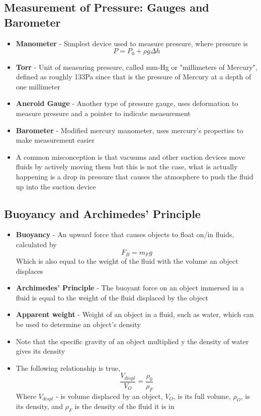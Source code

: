 \subsection{Measurement of Pressure: Gauges and Barometer}
\begin{itemize}
    \item \textbf{Manometer} - Simplest device used to measure pressure, where pressure is \[P=P_0+\rho g\Delta h\]
    \item \textbf{Torr} - Unit of measuring pressure, called mm-Hg or "millimeters of Mercury", defined as roughly 133Pa since that is the pressure of Mercury at a depth of one millimeter 
    \item \textbf{Aneroid Gauge} - Another type of pressure gauge, uses deformation to measure pressure and a pointer to indicate measurement
    \item \textbf{Barometer} - Modified mercury manometer, uses mercury's properties to make measurement easier
    \item A common misconception is that vacuums and other suction devices move fluids by actively moving them but this is not the case, what is actually happening is a drop in pressure that causes the atmosphere to push the fluid up into the suction device
\end{itemize}

\subsection{Buoyancy and Archimedes’ Principle}
\begin{itemize}
    \item \textbf{Buoyancy} - An upward force that causes objects to float on/in fluids, calculated by \[F_B=m_Fg\] Which is also equal to the weight of the fluid with the volume an object displaces
    \item \textbf{Archimedes' Principle} - The buoyant force on an object immersed in a fluid is equal to the weight of the fluid displaced by the object
    \item \textbf{Apparent weight} - Weight of an object in a fluid, such as water, which can be used to determine an object's density
    \item Note that the specific gravity of an object multiplied y the density of water gives its density
    \item The following relationship is true, \[\frac{V_{displ}}{V_O}=\frac{\rho_0}{\rho_F}\] Where \(V_{displ}\) - is volume displaced by an object, \(V_O\), is its full volume, \(\rho_O\), is its density, and \(\rho_F\) is the density of the fluid it is in
\end{itemize}

